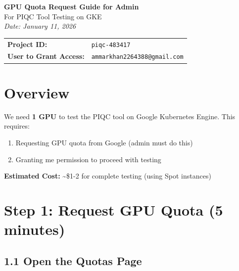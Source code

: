 \documentclass[11pt,a4paper]{article}
\begin{document}
\begin{center}
    {\LARGE\textbf{GPU Quota Request Guide for Admin}}\\[1em]
    {\large For PIQC Tool Testing on GKE}\\[0.5em]
    \textit{Date: January 11, 2026}
\end{center}

\vspace{1em}

\begin{tcolorbox}[colback=backcolour,colframe=black!50,title=\textbf{Project Information}]
\begin{tabular}{@{}ll@{}}
\textbf{Project ID:} & \texttt{piqc-483417} \\
\textbf{User to Grant Access:} & \texttt{ammarkhan2264388@gmail.com} \\
\end{tabular}
\end{tcolorbox}

\section{Overview}

We need \textbf{1 GPU} to test the PIQC tool on Google Kubernetes Engine. This requires:

\begin{enumerate}
    \item Requesting GPU quota from Google (admin must do this)
    \item Granting me permission to proceed with testing
\end{enumerate}

\textbf{Estimated Cost:} \textasciitilde\$1-2 for complete testing (using Spot instances)

\section{Step 1: Request GPU Quota (5 minutes)}

\subsection{1.1 Open the Quotas Page}
\end{document}
